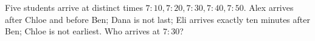 Five students arrive at distinct times $7{:}10,7{:}20,7{:}30,7{:}40,7{:}50$. Alex arrives after Chloe and before Ben; Dana is not last; Eli arrives exactly ten minutes after Ben; Chloe is not earliest. Who arrives at $7{:}30$?
